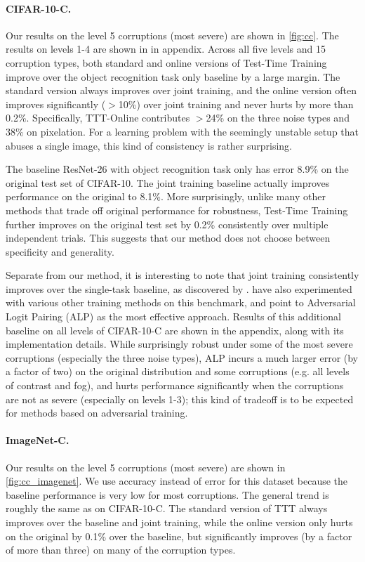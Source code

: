 \paragraph{CIFAR-10-C.}
Our results on the level 5 corruptions (most severe) are shown in \autoref{fig:cc}.
The results on levels 1-4 are shown in
 in appendix. 
Across all five levels and 15 corruption types, both standard and online versions of Test-Time Training improve over the object recognition task only baseline by a large margin. 
The standard version always improves over joint training, and the online version often improves significantly ($>$10\%) over joint training and never hurts by more than 0.2\%. 
Specifically, TTT-Online contributes $>$24\% on the three noise types and 38\% on pixelation. 
For a learning problem with the seemingly unstable setup that abuses a single image, this kind of consistency is rather surprising.

The baseline ResNet-26 with object recognition task only has error 8.9\% on the original test set of CIFAR-10. The joint training baseline actually improves performance on the original to 8.1\%. More surprisingly, unlike many other methods that trade off original performance for robustness, Test-Time Training further improves on the original test set by 0.2\% consistently over multiple independent trials. This suggests that our method does not choose between specificity and generality.

\newpage
Separate from our method, it is interesting to note that joint training consistently improves over the single-task baseline, as discovered by \citet{hendrycks2019using}.
\citet{hendrycks2019benchmarking} have also experimented with various other training methods on this benchmark, and point to Adversarial Logit Pairing (ALP) \citep{kannan2018adversarial} as the most effective approach. 
Results of this additional baseline on all levels of CIFAR-10-C are shown in the appendix, along with its implementation details. While surprisingly robust under some of the most severe corruptions (especially the three noise types), ALP incurs a much larger error (by a factor of two) on the original distribution and some corruptions (e.g. all levels of contrast and fog), and hurts performance significantly when the corruptions are not as severe (especially on levels 1-3); 
this kind of tradeoff is to be expected for methods based on adversarial training.



\paragraph{ImageNet-C.}
Our results on the level 5 corruptions (most severe) are shown in \autoref{fig:cc_imagenet}. We use accuracy instead of error for this dataset 
because the baseline performance is very low for most corruptions.
The general trend is roughly the same as on CIFAR-10-C. The standard version of TTT always improves over the baseline and joint training, while the online version only hurts on the original by 0.1\% over the baseline, but significantly improves (by a factor of more than three) on many of the corruption types.

